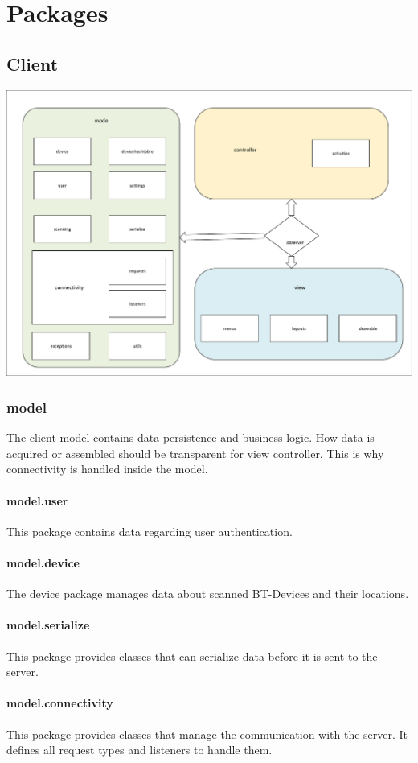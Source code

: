 \chapter{Packages}

\section{Client}

\includegraphics[width=\textwidth]{img/client_packages}

\subsection{model}
The client model contains data persistence and business logic. How data is acquired or assembled should be transparent for view controller. This is why connectivity is handled inside the model.
\subsubsection{model.user}
This package contains data regarding user authentication.
\subsubsection{model.device}
The device package manages data about scanned BT-Devices and their locations.
\subsubsection{model.serialize}
This package provides classes that can serialize data before it is sent to the server.
\subsubsection{model.connectivity}
This package provides classes that manage the communication with the server. It defines all request types and listeners to handle them.
